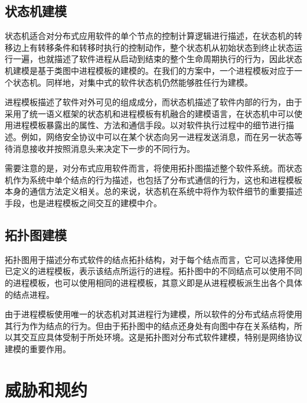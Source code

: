 \subsection{状态机建模}
状态机适合对分布式应用软件的单个节点的控制计算逻辑进行描述，在状态机的转移边上有转移条件和转移时执行的控制动作，整个状态机从初始状态到终止状态运行一遍，也就描述了软件进程从启动到结束的整个生命周期执行的行为，因此状态机建模是基于类图中进程模板的建模的。在我们的方案中，一个进程模板对应于一个状态机。同样地，对集中式的软件状态机仍然能够胜任行为建模。
\par
进程模板描述了软件对外可见的组成成分，而状态机描述了软件内部的行为，由于采用了统一语义框架的状态机和进程模板有机融合的建模语言，在状态机中可以使用进程模板暴露出的属性、方法和通信手段。以对软件执行过程中的细节进行描述。例如，网络安全协议中可以在某个状态向另一进程发送消息，而在另一状态等待消息接收并按照消息头来决定下一步的不同行为。
\par
需要注意的是，对分布式应用软件而言，将使用拓扑图描述整个软件系统。而状态机作为系统中单个结点的行为描述，也包括了分布式通信的行为，这也和进程模板本身的通信方法定义相关。总的来说，状态机在系统中将作为软件细节的重要描述手段，也是进程模板之间交互的建模中介。

\subsection{拓扑图建模}
拓扑图用于描述分布式软件的结点拓扑结构，对于每个结点而言，它可以选择使用已定义的进程模板，表示该结点所运行的进程。拓扑图中的不同结点可以使用不同的进程模板，也可以使用相同的进程模板，其意义即是从进程模板派生出各个具体的结点进程。
\par
由于进程模板使用唯一的状态机对其进程行为建模，所以软件的分布式结点将使用其行为作为结点的行为。但由于拓扑图中的结点还身处有向图中存在关系结构，所以其交互应具体受制于所处环境。这是拓扑图对分布式软件建模，特别是网络协议建模的重要作用。


\section{威胁和规约}